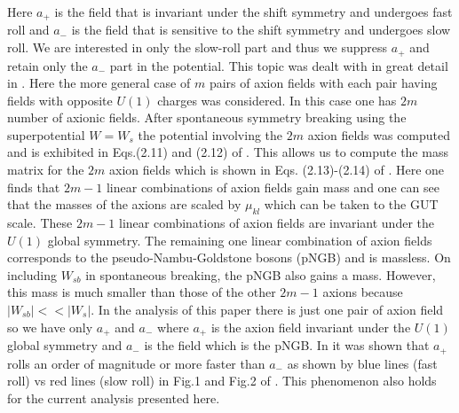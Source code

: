 \documentclass[a4paper,11pt]{article}
\begin{document}
  Here $a_+$ is the field that  is invariant under the shift symmetry and  undergoes fast roll and $a_-$ is the field that is sensitive to the shift symmetry and undergoes slow roll. We are interested in only the slow-roll part
  and thus we suppress $a_+$ and retain only the $a_-$ part in the potential. 
  This topic was dealt with in great detail in \cite{Nath:2017ihp}. Here the more general case of $m$ pairs of axion fields
  with each pair having fields with opposite $U(1)$ charges was considered.  In this case one has $2m$ number of axionic fields.
  After spontaneous symmetry breaking using the superpotential $W=W_s$ the potential involving the $2m$ axion 
  fields was computed and is exhibited in Eqs.(2.11) and (2.12) of  \cite{Nath:2017ihp}.  This allows us to compute the 
  mass matrix for the $2m$ axion fields which is shown in Eqs. (2.13)-(2.14) of  \cite{Nath:2017ihp}. Here one finds that $2m-1$ 
  linear combinations of   axion fields gain mass and one can see that the masses of the axions are scaled by $\mu_{kl}$ which can be taken to the 
  GUT scale. These $2m-1$ linear combinations of axion fields are invariant under the $U(1)$ global symmetry. The remaining one 
  linear combination of axion fields corresponds to the pseudo-Nambu-Goldstone bosons (pNGB)  and is massless. On including $W_{sb}$ in
   spontaneous breaking, the pNGB also gains a mass. However, this mass is much smaller than those of the other $2m-1$ axions 
   because $|W_{sb}| << |W_s|$. In the analysis of this paper there is just one pair of axion field so we have only $a_+$ and $a_-$ 
   where $a_+$ is the axion field invariant under the $U(1)$ global symmetry and $a_-$ is the field which is the pNGB.  
   In  \cite{Nath:2017ihp} it was shown that   $a_+$ rolls an order of magnitude or more  faster than $a_-$ as shown by blue lines (fast roll) vs red lines (slow roll) in Fig.1 and Fig.2 of  \cite{Nath:2017ihp}.  This phenomenon also holds for the current analysis presented here.
\end{document}
